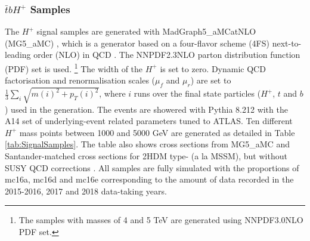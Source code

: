 \subsubsection{$\bar{t}bH^{+}$ Samples}
\label{subsec:HpSample}

\setcounter{Num}{2}

The $H^{+}$ signal samples are generated with MadGraph5\_aMCatNLO (MG5\_aMC) \cite{C.Degrande-2015}, which is a generator based on a four-flavor scheme (4FS) next-to-leading order (NLO) in QCD \cite{Alwall:2014hca}. The NNPDF2.3NLO \cite{Ball:2012cx} parton distribution function (PDF) set is used. \footnote{The samples with masses of 4 and 5 TeV are generated using NNPDF3.0NLO \cite{Ball:2014uwa} PDF set.} The width of the $H^{+}$ is set to zero. Dynamic QCD factorisation and renormalisation scales ($\mu_{f}$ and $\mu_{r}$) are set to $\frac{1}{3}\sum_{i}\sqrt{m(i)^{2}+p_{T}(i)^{2}}$, where $i$ runs over the final state particles ($H^{+}$, $t$ and $b$) used in the generation. The events are showered with Pythia 8.212 \cite{Sjostrand:2007gs} with the A14 \cite{ATL-PHYS-PUB-2014-021} set of underlying-event related parameters tuned to ATLAS. Ten different $H^{+}$ mass points between 1000 and 5000 GeV are generated as detailed in Table \ref{tab:SignalSamples}. The table also shows cross sections from MG5\_aMC and Santander-matched cross sections for 2HDM type- (a la MSSM), but without SUSY QCD corrections \cite{C.Degrande-2015, M.Flechl-2015, S.Dittmaier-2011, E.L.Berger-2005}. All samples are fully simulated with the proportions of mc16a, mc16d and mc16e corresponding to the amount of data recorded in the 2015-2016, 2017 and 2018 data-taking years.

